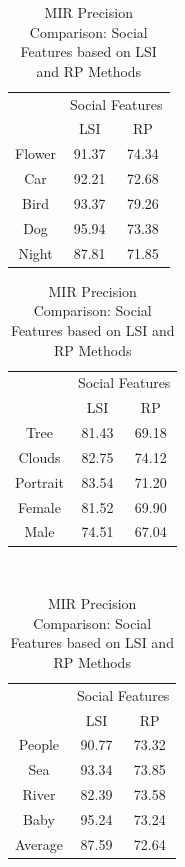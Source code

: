 \begin{table}[!ht]
  \caption{ MIR Precision Comparison: Social Features based on LSI and RP Methods} %
  \centering
  \begin{tabular}{|c|c|c|}
  \hline
   {\multirow{2}{*}{Labels}} & \multicolumn{2}{|c|}{Social Features} \\
   \cline{2-3}
    & LSI & RP \\
    \hline
Flower &  91.37 & 74.34 \\  [1ex] \hline
Car &  92.21 & 72.68  \\  [1ex] \hline
Bird & 93.37 & 79.26  \\  [1ex] \hline
Dog &  95.94 & 73.38 \\  [1ex] \hline
Night & 87.81 & 71.85  \\  [1ex] \hline
 \end{tabular}
 \hspace{1em}\vspace*{0.5cm}
 \begin{tabular}{|c|c|c|}
  \hline
{\multirow{2}{*}{Labels}} & \multicolumn{2}{|c|}{Social Features} \\ \cline{2-3}
 & LSI & RP \\ \hline
Tree &  81.43 & 69.18  \\  [1ex] \hline
Clouds & 82.75 & 74.12  \\  [1ex] \hline
Portrait & 83.54 & 71.20  \\  [1ex] \hline
Female & 81.52 & 69.90  \\  [1ex] \hline
Male &  74.51 & 67.04  \\  [1ex] \hline
\end{tabular}
 \hspace{1em}\vspace*{0.5cm}
\\
 \begin{tabular}{|c|c|c|}
  \hline
   {\multirow{2}{*}{Labels}} & \multicolumn{2}{|c|}{Social  Features} \\
   \cline{2-3}
    & LSI & RP \\
    \hline
 People &  90.77 & 73.32  \\  [1ex] \hline
Sea &  93.34 & 73.85  \\  [1ex] \hline
River &  82.39 & 73.58  \\  [1ex] \hline
Baby & 95.24 & 73.24  \\  [1ex] \hline
Average &  87.59 & 72.64  \\  [1ex] \hline
\end{tabular}
 \label{MIRPrecisionSocialFeatures} %
\end{table}
